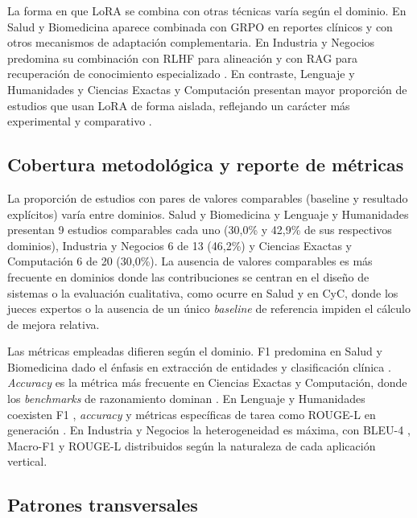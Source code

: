 La forma en que LoRA se combina con otras técnicas varía según el dominio. En Salud y Biomedicina aparece combinada con GRPO en reportes clínicos \parencite{kuo2025medical} y con otros mecanismos de adaptación complementaria. En Industria y Negocios predomina su combinación con RLHF para alineación \parencite{ren2025patent} y con RAG para recuperación de conocimiento especializado \parencite{xiong2025lora}. En contraste, Lenguaje y Humanidades y Ciencias Exactas y Computación presentan mayor proporción de estudios que usan LoRA de forma aislada, reflejando un carácter más experimental y comparativo \parencite{anghel2025courseeval, chen2025ft, xiang2024sumllama}.

\subsection{Cobertura metodológica y reporte de métricas}

La proporción de estudios con pares de valores comparables (baseline y resultado explícitos) varía entre dominios. Salud y Biomedicina y Lenguaje y Humanidades presentan 9 estudios comparables cada uno (30,0\% y 42,9\% de sus respectivos dominios), Industria y Negocios 6 de 13 (46,2\%) y Ciencias Exactas y Computación 6 de 20 (30,0\%). La ausencia de valores comparables es más frecuente en dominios donde las contribuciones se centran en el diseño de sistemas o la evaluación cualitativa, como ocurre en Salud y en CyC, donde los jueces expertos o la ausencia de un único \textit{baseline} de referencia impiden el cálculo de mejora relativa.

Las métricas empleadas difieren según el dominio. F1 predomina en Salud y Biomedicina dado el énfasis en extracción de entidades y clasificación clínica \parencite{zhou2024adapter}. \textit{Accuracy} es la métrica más frecuente en Ciencias Exactas y Computación, donde los \textit{benchmarks} de razonamiento dominan \parencite{liu2025tasks}. En Lenguaje y Humanidades coexisten F1 \parencite{han2025ft}, \textit{accuracy} \parencite{kadyrbek2025dpo, shen2025ft} y métricas específicas de tarea como ROUGE-L en generación \parencite{chen2025ft}. En Industria y Negocios la heterogeneidad es máxima, con BLEU-4 \parencite{ren2025patent}, Macro-F1 \parencite{yang2025hierarchic} y ROUGE-L \parencite{song2025lora} distribuidos según la naturaleza de cada aplicación vertical.

\subsection{Patrones transversales}

